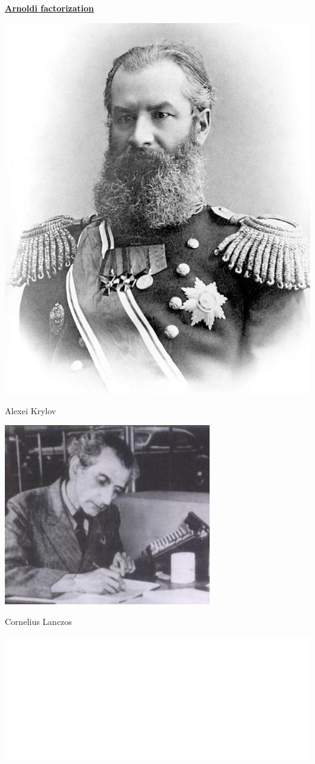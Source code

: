 \documentclass[aspectratio=169, usenames, dvipsnames]{beamer}
\begin{document}
\begin{frame}
  \vfill
  \centering
  \underline{\textbf{Arnoldi factorization}}

  \vfill

  \begin{minipage}{.48\textwidth}
    \centering
    \includegraphics[width=.5\textwidth]{krylov}

    {\tiny
      Alexei Krylov
    }
  \end{minipage}%
  \hfill
  \begin{minipage}{.48\textwidth}
    \centering
    \includegraphics[width=.7\textwidth]{lanczos}

    {\tiny
      Cornelius Lanczos
    }
  \end{minipage}
  
  \vfill
\end{frame}

\begin{frame}
  \vfill
  \centering

  \includegraphics[width=.8\textwidth]{arnoldi}
  
  \vfill
\end{frame}
\end{document}
